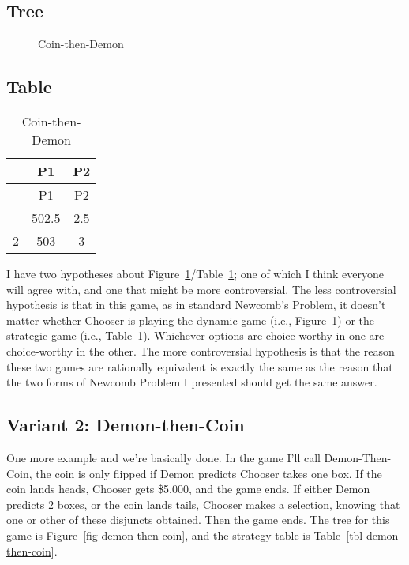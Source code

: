 \documentclass[
  10pt,
  letterpaper,
  DIV=11,
  numbers=noendperiod,
  twoside]{scrartcl}
\begin{document}
\subsection{Tree}

\begin{figure}


\caption{\label{fig-coin-then-demon}Coin-then-Demon}

\end{figure}%

\subsection{Table}

\begin{longtable}[]{@{}ccc@{}}
\caption{Coin-then-Demon}\label{tbl-coin-then-demon}\tabularnewline
\toprule\noalign{}
& P1 & P2 \\
\midrule\noalign{}
\endfirsthead
\toprule\noalign{}
& P1 & P2 \\
\midrule\noalign{}
\endhead
\bottomrule\noalign{}
\endlastfoot
1 & 502.5 & 2.5 \\
2 & 503 & 3 \\
\end{longtable}

I have two hypotheses about
Figure~\ref{fig-coin-then-demon}/Table~\ref{tbl-coin-then-demon}; one of
which I think everyone will agree with, and one that might be more
controversial. The less controversial hypothesis is that in this game,
as in standard Newcomb's Problem, it doesn't matter whether Chooser is
playing the dynamic game (i.e., Figure~\ref{fig-coin-then-demon}) or the
strategic game (i.e., Table~\ref{tbl-coin-then-demon}). Whichever
options are choice-worthy in one are choice-worthy in the other. The
more controversial hypothesis is that the reason these two games are
rationally equivalent is exactly the same as the reason that the two
forms of Newcomb Problem I presented should get the same answer.

\subsection{Variant 2: Demon-then-Coin}\label{variant-2-demon-then-coin}

One more example and we're basically done. In the game I'll call
Demon-Then-Coin, the coin is only flipped if Demon predicts Chooser
takes one box. If the coin lands heads, Chooser gets \$5,000, and the
game ends. If either Demon predicts 2 boxes, or the coin lands tails,
Chooser makes a selection, knowing that one or other of these disjuncts
obtained. Then the game ends. The tree for this game is
Figure~\ref{fig-demon-then-coin}, and the strategy table is
Table~\ref{tbl-demon-then-coin}.
\end{document}
